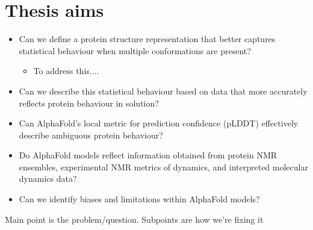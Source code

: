 \chapter*{Thesis aims}

\begin{itemize}
    \item Can we define a protein structure representation that better captures statistical behaviour when multiple conformations are present? 
    \begin{itemize}
        \item To address this....
        
    \end{itemize}
    \item Can we describe this statistical behaviour based on data that more accurately reflects protein behaviour in solution?
    \item Can AlphaFold’s local metric for prediction confidence (pLDDT) effectively describe ambiguous protein behaviour?
    \item Do AlphaFold models reflect information obtained from protein NMR ensembles, experimental NMR metrics of dynamics, and interpreted molecular dynamics data?
    \item Can we identify biases and limitations within AlphaFold models?
\end{itemize}

Main point is the problem/question. Subpoints are how we're fixing it



